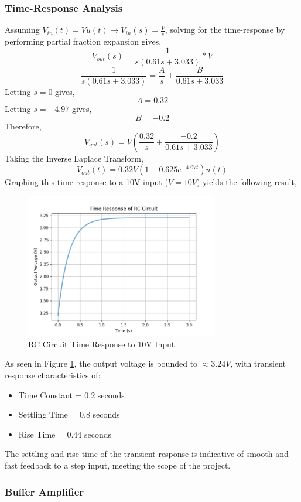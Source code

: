 \documentclass[12pt, a4paper]{article}
\begin{document}
\subsubsection{Time-Response Analysis}
\indent Assuming $V_{in}(t)=Vu(t) \rightarrow V_{in}(s)=\frac{V}{s}$, solving for the time-response by performing partial fraction expansion gives,
\[V_{out}(s)=\frac{1}{s(0.61s+3.033)}*V\]
\[\frac{1}{s(0.61s+3.033)}=\frac{A}{s}+\frac{B}{0.61s+3.033}\]
\indent \indent Letting $s=0$ gives,
\[A=0.32\]
\indent \indent Letting $s=-4.97$ gives,
\[B=-0.2\]
\indent \indent Therefore,
\[V_{out}(s)=V\left(\frac{0.32}{s}+\frac{-0.2}{0.61s+3.033}\right)\]
\indent \indent Taking the Inverse Laplace Transform,
\[V_{out}(t)=0.32V\left(1-0.625e^{-4.07t}\right)u(t)\]
Graphing this time response to a 10V input ($V=10V$) yields the following result,
\begin{figure}[H]
    \centering
    \includegraphics[width=0.75\textwidth]{graph10.png}
    \caption{RC Circuit Time Response to 10V Input}
    \label{fig:time_response}
\end{figure}
As seen in Figure \ref{fig:time_response}, the output voltage is bounded to $\approx3.24V$, with transient response characteristics of:
\begin{itemize}
    \item Time Constant = 0.2 seconds
    \item Settling Time = 0.8 seconds
    \item Rise Time = 0.44 seconds
\end{itemize}
The settling and rise time of the transient response is indicative of smooth and fast feedback to a step input, meeting the scope of the project.
\subsubsection{Buffer Amplifier}
\end{document}
